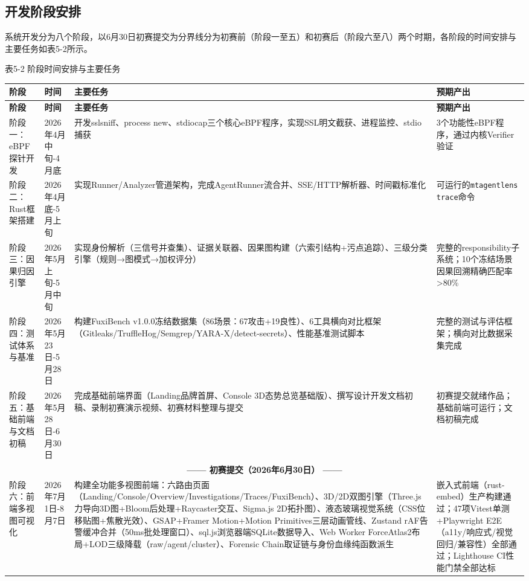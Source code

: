 \documentclass[a4paper]{ctexart}
\makeatletter
\renewcommand{\_}{%
  \ifmmode
    \nfss@text{\textunderscore}%
  \else
    \textunderscore\discretionary{}{}{}%
  \fi}
\makeatother
\begin{document}
\subsection{开发阶段安排}

系统开发分为八个阶段，以6月30日初赛提交为分界线分为初赛前（阶段一至五）和初赛后（阶段六至八）两个时期，各阶段的时间安排与主要任务如表5-2所示。



\medskip
{\centering\small
表5-2 阶段时间安排与主要任务\par
\vspace{3pt}
\setlength{\tabcolsep}{6pt}
\renewcommand{\arraystretch}{1.1}
\begin{longtable}{p{3.5cm} >{\raggedright\arraybackslash}p{2.6cm} >{\raggedright\arraybackslash}p{4.8cm} >{\raggedright\arraybackslash}p{3.5cm}}
\hline
\textbf{阶段} & \textbf{时间} & \textbf{主要任务} & \textbf{预期产出} \\
\hline
\endfirsthead
\hline
\textbf{阶段} & \textbf{时间} & \textbf{主要任务} & \textbf{预期产出} \\
\hline
\endhead
\hline
\endfoot
\hline
\endlastfoot
阶段一：eBPF探针开发 & 2026年4月中旬-4月底 & 开发sslsniff、process\_new、stdiocap三个核心eBPF程序，实现SSL明文截获、进程监控、stdio捕获 & 3个功能性eBPF程序，通过内核Verifier验证 \\*
\hline
阶段二：Rust框架搭建 & 2026年4月底-5月上旬 & 实现Runner/Analyzer管道架构，完成AgentRunner流合并、SSE/HTTP解析器、时间戳标准化 & 可运行的\texttt{mtagentlens trace}命令 \\
\hline
阶段三：因果归因引擎 & 2026年5月上旬-5月中旬 & 实现身份解析（三信号并查集）、证据关联器、因果图构建（六索引结构+污点追踪）、三级分类引擎（规则→图模式→加权评分） & 完整的responsibility子系统；10个冻结场景因果回溯精确匹配率>80\% \\
\hline
阶段四：测试体系与基准 & 2026年5月23日-5月28日 & 构建FuxiBench v1.0.0冻结数据集（86场景：67攻击+19良性）、6工具横向对比框架（Gitleaks/TruffleHog/Semgrep/YARA-X/detect-secrets）、性能基准测试脚本 & 完整的测试与评估框架；横向对比数据采集完成 \\
\hline
阶段五：基础前端与文档初稿 & 2026年5月28日-6月30日 & 完成基础前端界面（Landing品牌首屏、Console 3D态势总览基础版）、撰写设计开发文档初稿、录制初赛演示视频、初赛材料整理与提交 & 初赛提交就绪作品；基础前端可运行；文档初稿完成 \\
\hline
\multicolumn{4}{c}{\textbf{—— 初赛提交（2026年6月30日） ——}} \\*
\hline
阶段六：前端多视图可视化 & 2026年7月1日-8月7日 & 构建全功能多视图前端：六路由页面（Landing/Console/Overview/Investigations/Traces/FuxiBench）、3D/2D双图引擎（Three.js力导向3D图+Bloom后处理+Raycaster交互、Sigma.js 2D拓扑图）、液态玻璃视觉系统（CSS位移贴图+焦散光效）、GSAP+Framer Motion+Motion Primitives三层动画管线、Zustand rAF告警缓冲合并（50ms批处理窗口）、sql.js浏览器端SQLite数据导入、Web Worker ForceAtlas2布局+LOD三级降载（raw/agent/cluster）、Forensic Chain取证链与身份血缘纯函数派生 & 嵌入式前端（rust-embed）生产构建通过；47项Vitest单测+Playwright E2E（a11y/响应式/视觉回归/兼容性）全部通过；Lighthouse CI性能门禁全部达标 \\

\end{longtable}}
\end{document}
